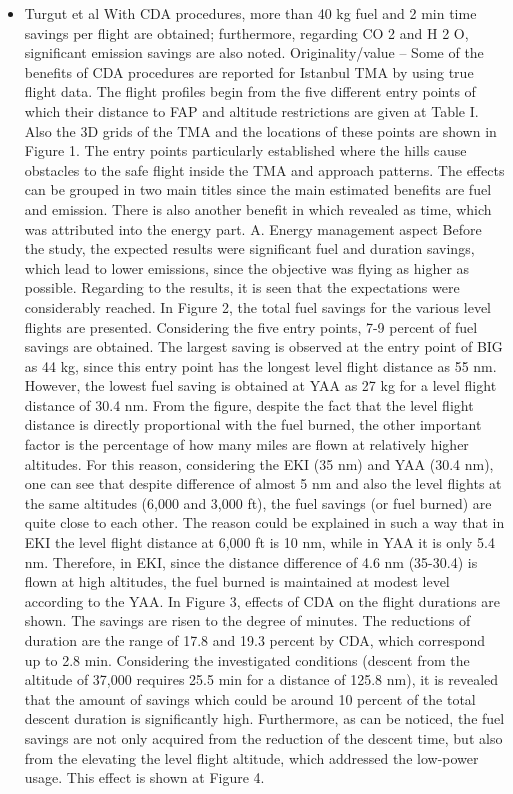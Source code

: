 \documentclass{aer1315-pretty}
\begin{document}
\begin{itemize}
\item Turgut et al \cite{Enis:2010}
With CDA procedures, more than 40 kg fuel and 2 min time savings per flight are obtained; furthermore, regarding CO 2 and H 2 O, significant emission savings are also noted. Originality/value – Some of the benefits of CDA procedures are reported for Istanbul TMA by using true flight data. The flight profiles begin from the five different entry points of
which their distance to FAP and altitude restrictions are given
at Table I. Also the 3D grids of the TMA and the locations of
these points are shown in Figure 1. The entry points
particularly established where the hills cause obstacles to the
safe flight inside the TMA and approach patterns.
  The effects can be grouped in two main titles since the main
estimated benefits are fuel and emission. There is also another
benefit in which revealed as time, which was attributed into
the energy part.
A. Energy management aspect
Before the study, the expected results were significant fuel and
duration savings, which lead to lower emissions, since the
objective was flying as higher as possible. Regarding to the
results, it is seen that the expectations were considerably reached.
  In Figure 2, the total fuel savings for the various level flights
are presented. Considering the five entry points, 7-9 percent
of fuel savings are obtained. The largest saving is observed at the entry point of BIG as 44 kg, since this entry point has the
longest level flight distance as 55 nm. However, the lowest fuel
saving is obtained at YAA as 27 kg for a level flight distance of
30.4 nm. From the figure, despite the fact that the level flight
distance is directly proportional with the fuel burned, the
other important factor is the percentage of how many miles
are flown at relatively higher altitudes. For this reason,
considering the EKI (35 nm) and YAA (30.4 nm), one can see
that despite difference of almost 5 nm and also the level flights
at the same altitudes (6,000 and 3,000 ft), the fuel savings
(or fuel burned) are quite close to each other. The reason
could be explained in such a way that in EKI the level flight
distance at 6,000 ft is 10 nm, while in YAA it is only 5.4 nm.
Therefore, in EKI, since the distance difference of 4.6 nm
(35-30.4) is flown at high altitudes, the fuel burned is
maintained at modest level according to the YAA.
  In Figure 3, effects of CDA on the flight durations are
shown. The savings are risen to the degree of minutes. The
reductions of duration are the range of 17.8 and 19.3 percent
by CDA, which correspond up to 2.8 min. Considering the
investigated conditions (descent from the altitude of 37,000
requires 25.5 min for a distance of 125.8 nm), it is revealed
that the amount of savings which could be around 10 percent
of the total descent duration is significantly high.
  Furthermore, as can be noticed, the fuel savings are not
only acquired from the reduction of the descent time, but also
from the elevating the level flight altitude, which addressed
the low-power usage. This effect is shown at Figure 4.


\end{itemize}
\end{document}
